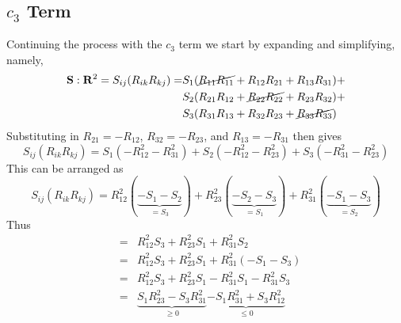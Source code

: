 \subsection{$c_{3}$ Term}
Continuing the process with the $c_{3}$ term we start by expanding and
simplifying, namely,
\begin{equation}
    \begin{split}
        \mathbf{S}:\mathbf{R}^2 =  S_{ij}(R_{ik}R_{kj}) = &  
                S_{1}(\cancel{R_{11} R_{11}} + R_{12} R_{21} + R_{13} R_{31}) +     \\
            &   S_{2}(R_{21} R_{12} + \cancel{R_{22} R_{22}} + R_{23} R_{32}) +     \\
            &   S_{3}(R_{31} R_{13} + R_{32} R_{23} + \cancel{R_{33} R_{33}})
    \end{split}
\end{equation}
Substituting in $R_{21} = -R_{12}$, $R_{32} = -R_{23}$, and $R_{13} = -
R_{31}$ then gives
\begin{equation}
    S_{ij}(R_{ik}R_{kj}) = 
        S_{1} (-R_{12}^2 - R_{31}^2)  +
        S_{2} (-R_{12}^2 - R_{23}^2)  +
        S_{3} (-R_{31}^2 - R_{23}^2)
\end{equation}
This can be arranged as
\begin{equation}
    S_{ij}(R_{ik}R_{kj}) = 
        R_{12}^{2} (\underbrace{-S_{1} - S_{2}}_{= S_{3}}) + 
        R_{23}^{2} (\underbrace{-S_{2} - S_{3}}_{= S_{1}}) + 
        R_{31}^{2} (\underbrace{-S_{1} - S_{3}}_{= S_{2}})  
\end{equation}
Thus
\begin{subequations}
\begin{eqnarray}
    & = & R_{12}^2 S_{3} + R_{23}^2 S_{1} + R_{31}^2 S_{2}                  \\
    & = & R_{12}^2 S_{3} + R_{23}^2 S_{1} + R_{31}^2 (-S_{1} - S_{3})       \\
    & = & R_{12}^2 S_{3} + R_{23}^2 S_{1} - R_{31}^2 S_{1} - R_{31}^2 S_{3} \\ 
    & = & \underbrace{S_{1} R_{23}^2 - S_{3} R_{31}^{2}}_{\geq 0}          
            \underbrace{-S_{1} R_{31}^2 + S_{3} R_{12}^2}_{\leq 0}
\end{eqnarray}
\end{subequations}


